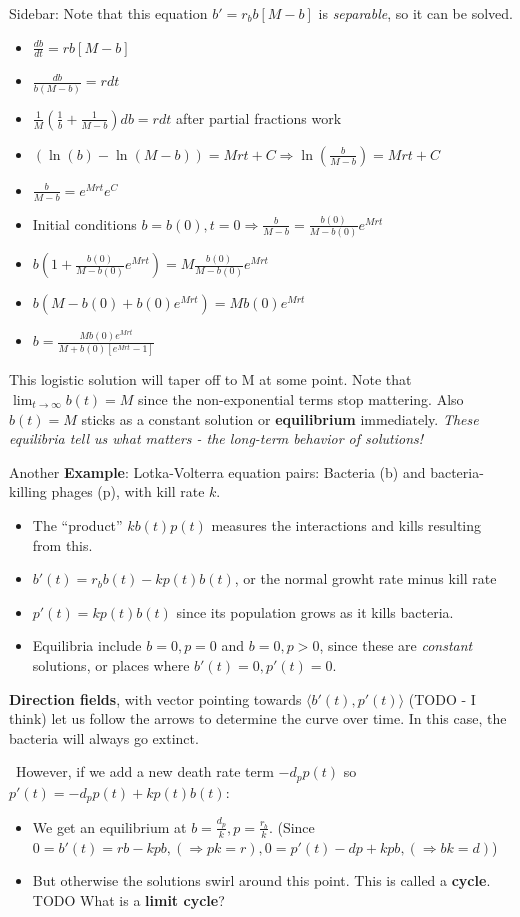 \documentclass[11pt, oneside]{article}   	%
\begin{document}
Sidebar: Note that this equation $b' = r_bb[M-b]$ is \emph{separable}, so it can be solved.
\begin{itemize}
\item $\frac{db}{dt} = rb[M-b]$
\item $\frac{db}{b(M-b)} = r dt$
\item $\frac{1}{M }(\frac{1}{b} + \frac{1}{M-b}) db = r dt$ after partial fractions work
\item $(\ln(b)-\ln(M-b)) = Mrt + C \Rightarrow \ln(\frac{b}{M-b}) = Mrt + C$
\item $\frac{b}{M-b} = e^{Mrt}e^{C}$
\item Initial conditions $b=b(0), t=0 \Rightarrow \frac{b}{M-b} = \frac{b(0)}{M-b(0)} e^{Mrt}$
\item  $b(1+\frac{b(0)}{M-b(0)} e^{Mrt}) = M \frac{b(0)}{M-b(0)} e^{Mrt}$
\item  $b(M-b(0)+b(0)e^{Mrt}) = M b(0) e^{Mrt}$
\item $b = \frac{Mb(0)e^{Mrt}}{M+b(0)[e^{Mrt} -1]}$
\end{itemize}


This logistic solution will taper off to M at some point. Note that $\lim_{t \rightarrow \infty} b(t) = M$ since the non-exponential terms stop mattering.  Also $b(t) = M$ sticks as a constant solution or \textbf{equilibrium} immediately.  \emph{These equilibria tell us what matters - the long-term behavior of solutions!}

Another \textbf{Example}: Lotka-Volterra equation pairs: Bacteria (b) and bacteria-killing phages (p), with kill rate $k$.
\begin{itemize}
\item The ``product'' $k b(t)p(t)$ measures the interactions and kills resulting from this.
\item $b'(t) = r_b b(t) - k p(t) b(t)$, or the normal growht rate minus kill rate
\item $p'(t) = kp(t)b(t)$ since its population grows as it kills bacteria.
\item Equilibria include $b = 0, p = 0$ and $b = 0, p > 0$, since these are \emph{constant} solutions, or places where $b'(t) = 0, p'(t) = 0$.
\end{itemize}

\textbf{Direction fields}, with vector pointing towards $\langle b'(t), p'(t) \rangle$ (TODO - I think) let us follow the arrows to determine the curve over time.  In this case, the bacteria will always go extinct.

\ 
However, if we add a new death rate term $-d_pp(t)$ so $p'(t) = -d_pp(t) + kp(t)b(t)$:
\begin{itemize}
\item We get an equilibrium at $b = \frac{d_p}{k}, p = \frac{r_b}{k}$. (Since $0 = b'(t) = rb - kpb, (\Rightarrow pk = r), 0 = p'(t)  -dp + kpb,(\Rightarrow bk = d)$)
\item But otherwise the solutions swirl around this point.  This is called a \textbf{cycle}.  TODO What is a \textbf{limit cycle}?
\end{itemize}
\end{document}
